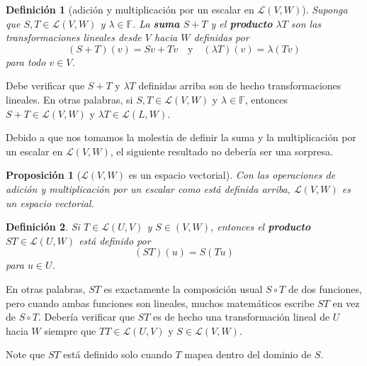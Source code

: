 \documentclass[b5paper, 11pt]{book}
\newcommand{\0}{\mathbf{0}}
\theoremstyle{estiloB}
\newtheorem{unadefig}{Definición}[chapter]
\newtheorem{propog}{Proposición}[chapter]
\theoremstyle{estiloC}
\theoremstyle{estiloD}
\begin{document}
\begin{unadefig}[adición y multiplicación por un escalar en $\mathcal{L}\left(V,W\right)$]
Suponga que $S, T\in\mathcal{L}\left(V,W\right)$ y $\lambda\in\mathds{F}$. La \textbf{suma} $S+T$ y el \textbf{producto} $\lambda T$ son las transformaciones lineales desde $V$ hacia $W$ definidas por
\[
\left(S+T\right)\left(v\right)=Sv+Tv\quad\text{y}\quad\left(\lambda T\right)\left(v\right)=\lambda\left(Tv\right)
\]
para todo $v\in V$.
\end{unadefig}
Debe verificar que $S+T$ y $\lambda T$ definidas arriba son de hecho transformaciones lineales. En otras palabras, si $S, T\in\mathcal{L}\left(V,W\right)$ y $\lambda\in\mathds{F}$, entonces $S+T\in\mathcal{L}\left(V,W\right)$ y $\lambda T\in\mathcal{L}\left(L,W\right)$.

Debido a que nos tomamos la molestia de definir la suma y la multiplicación por un escalar en $\mathcal{L}\left(V,W\right)$, el siguiente resultado no debería ser una sorpresa.

\begin{propog}[$\mathcal{L}\left(V,W\right)$ es un espacio vectorial]
Con las operaciones de adición y multiplicación por un escalar como está definida arriba, $\mathcal{L}\left(V,W\right)$ es un espacio vectorial.
\end{propog}

\begin{unadefig}
Si $T\in\mathcal{L}\left(U,V\right)$ y $S\in\left(V,W\right)$, entonces el \textbf{producto} $ST\in\mathcal{L}\left(U,W\right)$ está definido por
\[
\left(ST\right)\left(u\right)=S\left(T u\right)
\]
para $u\in U$.
\end{unadefig}
En otras palabras, $ST$ es exactamente la composición usual $S\circ T$ de dos funciones, pero cuando ambas funciones son lineales, muchos matemáticos escribe $ST$ en vez de $S\circ T$. Debería verificar que $ST$ es de hecho una transformación lineal de $U$ hacia $W$ siempre que $TT\in\mathcal{L}\left(U,V\right)$ y $S\in\mathcal{L}\left(V,W\right)$.

Note que $ST$ está definido solo cuando $T$ mapea dentro del dominio de $S$.

\nocite{*}
\printbibliography[title={Referencias bibliográficas},heading=bibintoc]
\end{document}
